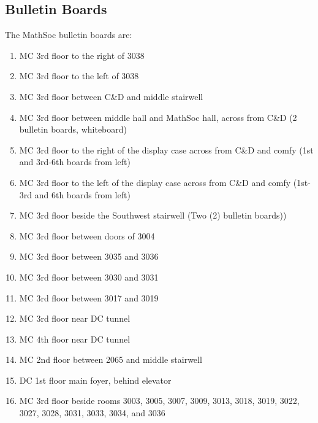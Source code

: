 \subsection{Bulletin Boards}
The MathSoc bulletin boards are:
\begin{enumerate}
\item MC 3rd floor to the right of 3038
\item MC 3rd floor to the left of 3038
\item MC 3rd floor between C\&D and middle stairwell
\item MC 3rd floor between middle hall and MathSoc hall, across from C\&D (2 bulletin boards, whiteboard)
\item MC 3rd floor to the right of the display case across from C\&D and comfy (1st and 3rd-6th boards from left)
\item MC 3rd floor to the left of the display case across from C\&D and comfy (1st-3rd and 6th boards from left)
\item MC 3rd floor beside the Southwest stairwell (Two (2) bulletin boards))
\item MC 3rd floor between doors of 3004
\item MC 3rd floor between 3035 and 3036
\item MC 3rd floor between 3030 and 3031
\item MC 3rd floor between 3017 and 3019
\item MC 3rd floor near DC tunnel
\item MC 4th floor near DC tunnel
\item MC 2nd floor between 2065 and middle stairwell
\item DC 1st floor main foyer, behind elevator
\item MC 3rd floor beside rooms 3003, 3005, 3007, 3009, 3013, 3018, 3019, 3022, 3027, 3028, 3031, 3033, 3034, and 3036
\end{enumerate}

